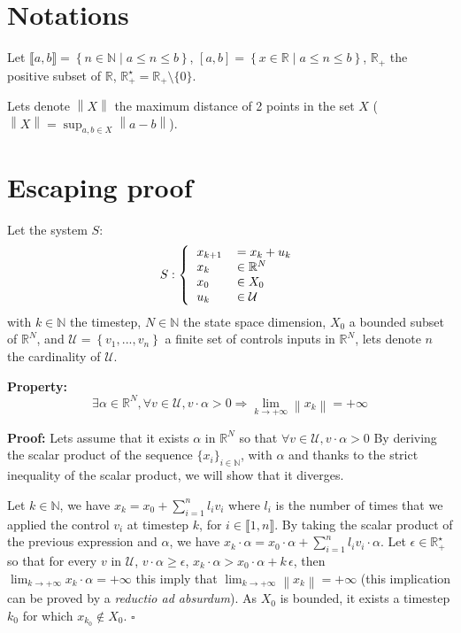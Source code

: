\documentclass[12pt]{article}
\begin{document}
\newcommand{\argmin}{\operatornamewithlimits{argmin}}

\section*{Notations}

Let $\llbracket a,b \rrbracket = \left \{n \in \mathbb{N} \mid a \leq n \leq b \right \}$, $\left [ a,b \right ]= \left \{x \in \mathbb{R} \mid a \leq n \leq b \right \}$, $\mathbb{R}_+$ the positive subset of $\mathbb{R}$, $\mathbb{R}_+^\star = \mathbb{R}_+ \setminus \{0\}$.

Lets denote $\left \| X \right \|$ the maximum distance of 2 points in the set $X$ ( $\left \| X \right \| = \sup_{a,b \in X} \left \| a-b\right \|$).

\section*{Escaping proof}

Let the system $S$:
\begin{equation}
S:\left \{
  \begin{tabular}{ll}
  $x_{k+1}$ &$= x_k + u_k$\\
  $x_k$ & $\in \mathbb{R}^N$\\
  $x_0$ & $\in X_0$\\
  $u_k$ & $\in \mathcal{U}$
  \end{tabular}
\right.
\end{equation}
with $k \in \mathbb{N}$ the timestep, $N \in \mathbb{N}$ the state space dimension, $X_0$ a bounded subset of $\mathbb{R}^N$, and $\mathcal{U} = \left \{v_1,...,v_n \right \}$ a finite set of controls inputs in $\mathbb{R}^N$, lets denote $n$ the cardinality of $\mathcal{U}$.

\textbf{Property:}
$$
\exists \alpha \in \mathbb{R}^N, \forall v \in \mathcal{U}, v \cdot \alpha > 0
\Rightarrow
\lim_{k \rightarrow + \infty} \left \| x_k \right \| = +\infty
$$

\textbf{Proof:}
Lets assume that it exists $\alpha$ in $\mathbb{R}^N$ so that $\forall v \in \mathcal{U}, v \cdot \alpha > 0$
By deriving the scalar product of the sequence $\{x_i \}_{i \in \mathbb{N}}$, with $\alpha$ and thanks to the strict inequality of the scalar product, we will show that it diverges.

Let $k \in \mathbb{N}$, we have $x_{k} = x_0 + \sum_{i=1}^{n} l_i v_i$ where $l_i$ is the number of times that we applied the control $v_i$ at timestep $k$, for  $i \in \llbracket 1,n \rrbracket$.
By taking the scalar product of the previous expression and $\alpha$, we have $x_k \cdot \alpha = x_0 \cdot \alpha + \sum_{i=1}^{n} l_i v_i \cdot \alpha$. Let  $\epsilon \in \mathbb{R}_+^\star$ so that for every $v$ in $\mathcal{U}$, $v \cdot \alpha \geq \epsilon$, $x_k \cdot \alpha > x_0 \cdot \alpha + k \, \epsilon$, then $\lim_{k \rightarrow + \infty} x_k \cdot \alpha = +\infty$ this imply that $\lim_{k \rightarrow + \infty} \left \| x_k \right \| = +\infty$ (this implication can be proved by a \textit{reductio ad absurdum}). As $X_0$ is bounded, it exists a timestep $k_0$ for which $x_{k_0} \notin X_0$. $\square$
\end{document}
